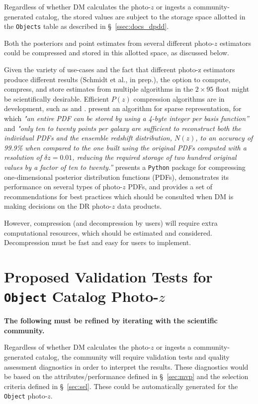 \documentclass[DM,lsstdraft,toc]{lsstdoc}
\begin{document}
Regardless of whether DM calculates the photo-$z$ or ingests a community-generated catalog, the stored values are subject to the storage space allotted in the {\tt Objects} table as described in \S~\ref{ssec:docs_dpdd}.

Both the posteriors and point estimates from several different photo-$z$ estimators could be compressed and stored in this allotted space, as discussed below.

Given the variety of use-cases and the fact that different photo-z estimators produce different results (Schmidt et al., in prep.), the option to compute, compress, and store estimates from multiple algorithms in the $2\times95$ float might be scientifically desirable.
Efficient $P(z)$ compression algorithms are in development, such as \citet{2014MNRAS.441.3550C} and \citet{2018AJ....156...35M}.
\citet{2014MNRAS.441.3550C} present an algorithm for sparse representation, for which {\it "an entire PDF can be stored by using a 4-byte integer per basis function''} and {\it "only ten to twenty points per galaxy are sufficient to reconstruct both the individual PDFs and the ensemble redshift distribution, $N(z)$, to an accuracy of 99.9\% when compared to the one built using the original PDFs computed with a resolution of $\delta z = 0.01$, reducing the required storage of two hundred original values by a factor of ten to twenty.''} 
\citet{2018AJ....156...35M} presents a {\tt Python} package for compressing one-dimensional posterior distribution functions (PDFs), demonstrates its performance on several types of photo-$z$ PDFs, and provides a set of recommendations for best practices which should be consulted when DM is making decisions on the DR photo-$z$ data products.

However, compression (and decompression by users) will require extra computational resources, which should be estimated and considered.
Decompression must be fast and easy for users to implement.



\clearpage
\section{Proposed Validation Tests for {\tt Object} Catalog Photo-$z$} \label{sec:validation}

{\bf The following must be refined by iterating with the scientific community.}

Regardless of whether DM calculates the photo-$z$ or ingests a community-generated catalog, the community will require validation tests and quality assessment diagnostics in order to interpret the results.
These diagnostics would be based on the attributes/performance defined in \S~\ref{sec:mvp} and the selection criteria defined in \S~\ref{sec:sel}. 
These could be automatically generated for the {\tt Object} photo-$z$.
\end{document}
